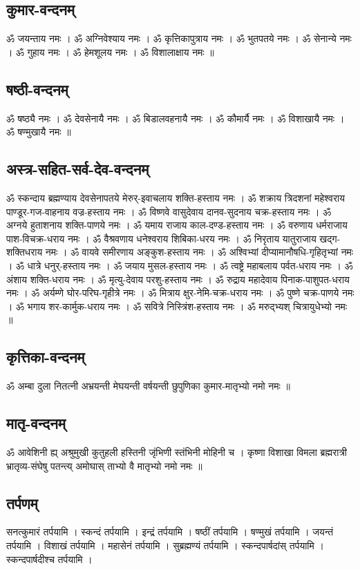 \documentclass[12pt]{article}
\begin{document}
\subsection{{\skt कुमार-वन्दनम् }}
{\large {\skt ॐ जयन्ताय नमः । ॐ अग्निवेश्याय नमः । ॐ कृत्तिकापुत्राय नमः । ॐ भुतपतये नमः । ॐ सेनान्ये नमः । ॐ गुहाय नमः । ॐ हेमशूलय नमः । ॐ विशालाक्षाय नमः ॥}}
\subsection{{\skt षष्ठी-वन्दनम् }}
{\large {\skt ॐ षष्ठ्यै नमः । ॐ देवसेनायै नमः । ॐ बिडालवहनायै नमः । ॐ कौमार्यै नमः । ॐ विशाखायै नमः । ॐ षण्मुखायै नमः ॥  }}
\subsection{{\skt अस्त्र-सहित-सर्व-देव-वन्दनम् }}
{\large {\skt ॐ स्कन्दाय ब्रह्मण्याय देवसेनापतये मेरुर्-इवाचलाय शक्ति-हस्ताय नमः । ॐ शक्राय त्रिदशनां महेश्वराय पाण्डूर-गज-वाहनाय वज्र-हस्ताय नमः । ॐ विष्णवे वासुदेवाय दानव-सुदनाय चक्र-हस्ताय नमः । ॐ अग्नये हुताशनाय शक्ति-पाणये नमः । ॐ यमाय राजाय काल-दण्ड-हस्ताय नमः । ॐ वरुणाय धर्मराजाय पाश-विचक्र-धराय नमः । ॐ वैश्रवणाय धनेश्वराय शिबिका-धरय नमः । ॐ निरृताय यातुराजाय खद्ग-शक्तिधराय नमः । ॐ वायवे समीरणाय अङ्कुश-हस्ताय नमः । ॐ अश्विभ्यां दीप्यामानौषधि-गृहितृभ्यां नमः । ॐ धात्रे धनुर्-हस्ताय  नमः । ॐ जयाय मुसल-हस्ताय  नमः । ॐ त्वष्ट्रे महाबलाय पर्वत-धराय नमः । ॐ अंशाय शक्ति-धराय  नमः । ॐ मृत्यु-देवाय परशु-हस्ताय  नमः । ॐ रुद्राय महादेवाय पिनाक-पाशुपत-धराय  नमः । ॐ अर्यम्णे घोर-परिघ-गृहीत्रे नमः । ॐ मित्राय क्षुर-नेमि-चक्र-धराय  नमः । ॐ पुष्णे चक्र-पाणये  नमः । ॐ भगाय शर-कार्मुक-धराय  नमः । ॐ सवित्रे निस्त्रिंश-हस्ताय नमः । ॐ मरुद्भ्यश् चित्रायुधेभ्यो  नमः ॥ }}
\subsection{{\skt कृत्तिका-वन्दनम् }}
{\large {\skt ॐ अम्बा दुला नितत्नी अभ्रयन्ती मेघयन्ती वर्षयन्ती छुपुणिका कुमार-मातृभ्यो नमो नमः ॥ }}
\subsection{{\skt मातृ-वन्दनम् }}
{\large {\skt ॐ आवेशिनी ह्य् अश्रुमुखी कुतुहली हस्तिनी जृंभिणी स्तंभिनी मोहिनी च । कृष्णा विशाखा विमला ब्रह्मरात्री भ्रातृव्य-संघेषु पतन्त्य् अमोघास् ताभ्यो वै मातृभ्यो नमो नमः ॥ }}
\subsection{{\skt तर्पणम् }}
{\large {\skt सनत्कुमारं तर्पयामि । स्कन्दं तर्पयामि । इन्द्रं तर्पयामि । षष्ठीं तर्पयामि । षण्मुखं तर्पयामि । जयन्तं तर्पयामि । विशाखं तर्पयामि । महासेनं तर्पयामि । सुब्रह्मण्यं तर्पयामि । स्कन्दपार्षदांस् तर्पयामि । स्कन्दपार्षदीश्च तर्पयामि । }}
\end{document}
